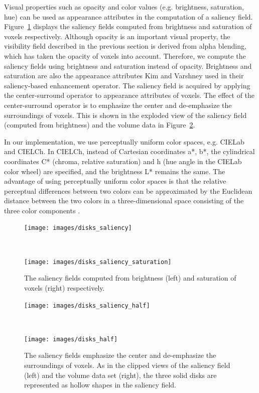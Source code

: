 Visual properties such as opacity and color values (e.g. brightness, saturation, hue) can be used as appearance attributes in the computation of a saliency field.
Figure~\ref{fig:disks_saliency} displays the saliency fields computed from brightness and saturation of voxels respectively.
Although opacity is an important visual property, the visibility field described in the previous section is derived from alpha blending, which has taken the opacity of voxels into account. Therefore, we compute the saliency fields using brightness and saturation instead of opacity. Brightness and saturation are also the appearance attributes Kim and Varshney \cite{kim_saliency-guided_2006} used in their saliency-based enhancement operator.
The saliency field is acquired by applying the center-surround operator to appearance attributes of voxels.
The effect of the center-surround operator is to emphasize the center and de-emphasize the surroundings of voxels. This is shown in the exploded view of the saliency field (computed from brightness) and the volume data in Figure~\ref{fig:disks_saliency_half}.

In our implementation, we use perceptually uniform color spaces, e.g. CIELab and CIELCh.
In CIELCh, instead of Cartesian coordinates a*, b*, the cylindrical coordinates C* (chroma, relative saturation) and h (hue angle in the CIELab color wheel) are specified, and the brightness L* remains the same.
The advantage of using perceptually uniform color spaces is that the relative perceptual differences between two colors can be approximated by the Euclidean distance between the two colors in a three-dimensional space consisting of the three color components \cite{fairchild_color_2013}.

\begin{figure}
	\centering
	\begin{minipage}{.45\textwidth}
		\texttt{[image: images/disks\_saliency]}
	\end{minipage}~
	\begin{minipage}{.45\textwidth}
		\texttt{[image: images/disks\_saliency\_saturation]}
	\end{minipage}
	\caption{The saliency fields computed from brightness (left) and saturation of voxels (right) respectively.}
	\label{fig:disks_saliency}
\end{figure}

\begin{figure}
	\centering
	\begin{minipage}{.45\textwidth}
		\texttt{[image: images/disks\_saliency\_half]}
	\end{minipage}~
	\begin{minipage}{.45\textwidth}
		\texttt{[image: images/disks\_half]}
	\end{minipage}
	\caption{The saliency fields emphasize the center and de-emphasize the surroundings of voxels. As in the clipped views of the saliency field (left) and the volume data set (right), the three solid disks are represented as hollow shapes in the saliency field.}
	\label{fig:disks_saliency_half}
\end{figure}

